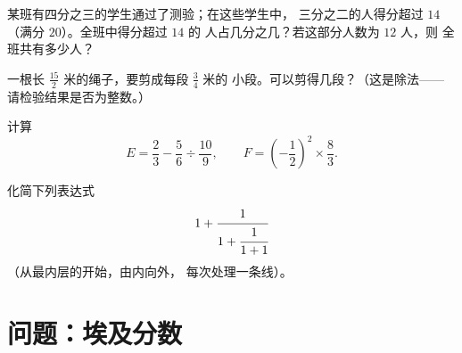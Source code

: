 \begin{exercise}[$\star\star$]\label{exo:g8:fractions:9}
某班有四分之三的学生通过了测验；在这些学生中，
三分之二的人得分超过 $14$（满分 $20$）。全班中得分超过 $14$ 的
人占几分之几？若这部分人数为 $12$ 人，则
全班共有多少人？
\end{exercise}

\begin{exercise}[$\star\star$]\label{exo:g8:fractions:10}
一根长 $\frac{15}{2}$ 米的绳子，要剪成每段 $\frac{3}{4}$ 米的
小段。可以剪得几段？（这是除法——
请检验结果是否为整数。）
\end{exercise}

\begin{exercise}[$\star\star$]\label{exo:g8:fractions:11}
计算
\[
E = \frac{2}{3} - \frac{5}{6} \div \frac{10}{9},
\qquad
F = \left(-\frac{1}{2}\right)^2 \times \frac{8}{3} .
\]
\end{exercise}

\begin{exercise}[$\star\star\star$]\label{exo:g8:fractions:12}
化简下列表达式
\[
1 + \cfrac{1}{1 + \cfrac{1}{1 + 1}}
\]
（从最内层的开始，由内向外，
每次处理一条线）。
\end{exercise}

\section{问题：埃及分数}

